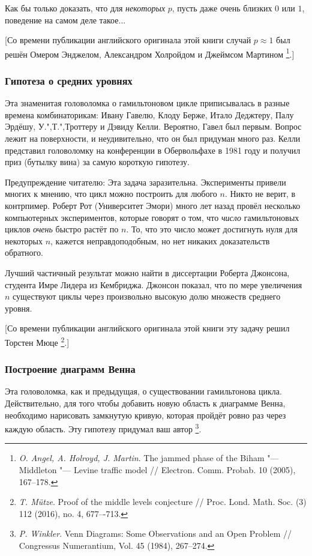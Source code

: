 \documentclass[twoside]{book}
\begin{document}
Как бы только доказать, что для \emph{некоторых} $p$, пусть даже очень близких  $0$ или $1$, поведение на самом деле такое...

[Со времени публикации английского оригинала этой книги случай $p\approx 1$ был решён Омером Энджелом,
Александром Холройдом и Джеймсом Мартином%
\footnote{\emph{O. Angel, A. Holroyd, J. Martin}. 
The jammed phase of the Biham "--- Middleton "--- Levine traffic model /\!/
{Electron. Comm. Probab.} 10 (2005), 167--178.}.]

\subsubsection*{Гипотеза о средних уровнях}

Эта знаменитая головоломка о гамильтоновом цикле приписывалась в разные времена комбинаторикам: Ивану Гавелю, Клоду Берже, Итало Деджтеру, Палу Эрдёшу, У.",Т.",Троттеру и Дэвиду Келли.
Вероятно, Гавел был первым.
Вопрос лежит на поверхности, и неудивительно, что он был придуман много раз.
Келли представил головоломку на конференции в Обервольфахе в 1981 году и получил приз (бутылку вина) за самую короткую гипотезу.


Предупреждение читателю:
Эта задача заразительна. 
Эксперименты привели многих к мнению, что цикл можно построить для любого $n$.
Никто не верит, в контрпимер.
Роберт Рот (Университет Эмори) много лет назад провёл несколько компьютерных экспериментов, которые говорят о том, что \emph{число} гамильтоновых циклов \emph{очень} быстро растёт по $n$.
То, что это число может достигнуть нуля для некоторых $n$, кажется неправдоподобным, но нет никаких доказательств обратного.

Лучший частичный результат можно найти в диссертации Роберта Джонсона, студента Имре Лидера из Кембриджа.
Джонсон показал, что по мере увеличения $n$ существуют циклы через произвольно высокую долю множеств среднего уровня.

[Со времени публикации английского оригинала этой книги эту задачу решил Торстен Мюце
\footnote{\emph{T. Mütze}. 
Proof of the middle levels conjecture /\!/
{Proc. Lond. Math. Soc.} (3) 112 (2016), no. 4, 677–-713.}.]

\subsubsection*{Построение диаграмм Венна}

Эта головоломка, как и предыдущая, о существовании гамильтонова цикла. 
Действительно, для того чтобы добавить новую область к диаграмме Венна, необходимо нарисовать замкнутую кривую, которая пройдёт ровно раз через каждую область.
Эту гипотезу придумал ваш автор%
\footnote{\emph{P. Winkler}. Venn Diagrams: Some Observations and an Open Problem /\!/ {Congressus Numerantium}, Vol. 45 (1984), 267--274.}.
\end{document}

